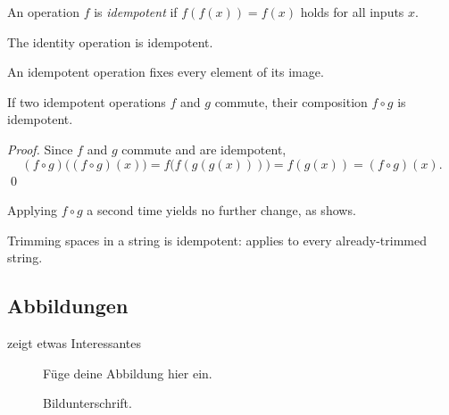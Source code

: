 \begin{ltgexample}
\begin{definition}[Idempotence]
  An operation $f$ is \emph{idempotent} if $f(f(x)) = f(x)$ holds for all inputs $x$.
\end{definition}

\begin{proposition}
  The identity operation is idempotent.
\end{proposition}

\begin{lemma}\label{lem:fixed}
  An idempotent operation fixes every element of its image.
\end{lemma}

\begin{theorem}\label{thm:idempotent-composition}
  If two idempotent operations $f$ and $g$ commute, their composition $f \circ g$ is idempotent.
\end{theorem}

\begin{proof}
  Since $f$ and $g$ commute and are idempotent,
  \begin{equation}
    (f \circ g)\bigl((f \circ g)(x)\bigr) = f\bigl(f(g(g(x)))\bigr) = f(g(x)) = (f \circ g)(x).
    \label{eq:idempotent-composition}
  \end{equation}
  \qed
\end{proof}

\begin{corollary}
  Applying $f \circ g$ a second time yields no further change, as  shows.
\end{corollary}

\begin{example}
  Trimming spaces in a string is idempotent:  applies to every already-trimmed string.
\end{example}
\end{ltgexample}

\subsection{Abbildungen}

\begin{ltgexample}
 zeigt etwas Interessantes

\begin{figure}
  \centering
  Füge deine Abbildung hier ein.
  \caption{Bildunterschrift.}
  \label{fig:label}
\end{figure}
\end{ltgexample}

